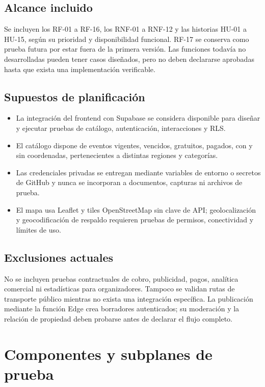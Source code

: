 \documentclass[11pt,a4paper]{article}
\begin{document}
\subsection{Alcance incluido}

Se incluyen los RF-01 a RF-16, los RNF-01 a RNF-12 y las historias HU-01 a HU-15,
según su prioridad y disponibilidad funcional. RF-17 se conserva como prueba futura por
estar fuera de la primera versión. Las funciones todavía no desarrolladas pueden tener
casos diseñados, pero no deben declararse aprobadas hasta que exista una implementación
verificable.

\subsection{Supuestos de planificación}

\begin{itemize}[leftmargin=1.5em]
  \item La integración del frontend con Supabase se considera disponible para diseñar y
        ejecutar pruebas de catálogo, autenticación, interacciones y RLS.
  \item El catálogo dispone de eventos vigentes, vencidos, gratuitos, pagados, con y sin
        coordenadas, pertenecientes a distintas regiones y categorías.
  \item Las credenciales privadas se entregan mediante variables de entorno o secretos de
        GitHub y nunca se incorporan a documentos, capturas ni archivos de prueba.
  \item El mapa usa Leaflet y tiles OpenStreetMap sin clave de API; geolocalización y geocodificación de respaldo requieren pruebas de permisos, conectividad y límites de uso.
\end{itemize}

\subsection{Exclusiones actuales}

No se incluyen pruebas contractuales de cobro, publicidad, pagos, analítica comercial ni
estadísticas para organizadores. Tampoco se validan rutas de transporte público mientras
no exista una integración específica. La publicación mediante la función Edge crea borradores autenticados; su moderación y la relación de propiedad deben probarse antes de declarar el flujo completo.

\section{Componentes y subplanes de prueba}
\end{document}
